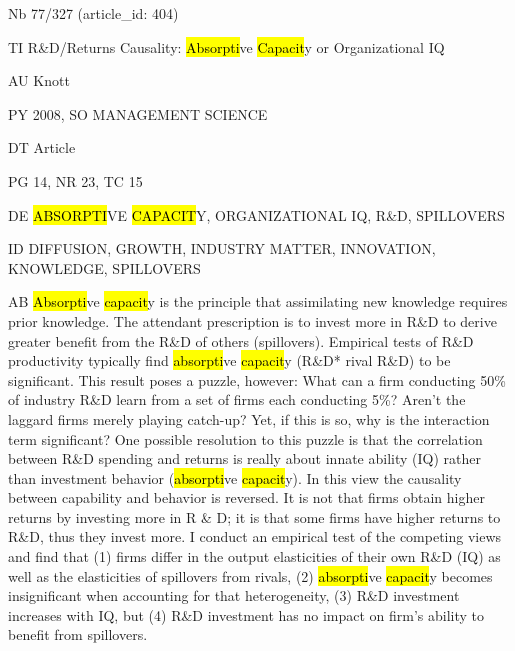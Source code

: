 \documentclass[a4paper]{article}
\begin{document}
\vspace*{-2cm}
Nb \tabto{0cm}77/327 (article\_id: 404)\par
TI \tabto{0cm}R\&D/Returns Causality: \hl{Absorpti}ve \hl{Capacit}y or Organizational IQ\par
AU \tabto{0cm}Knott\par
PY \tabto{0cm}2008, SO MANAGEMENT SCIENCE\par
DT \tabto{0cm}Article\par
PG \tabto{0cm}14, NR 23, TC 15\par
DE \tabto{0cm}\hl{ABSORPTI}VE \hl{CAPACIT}Y, ORGANIZATIONAL IQ, R\&D, SPILLOVERS\par
ID \tabto{0cm}DIFFUSION, GROWTH, INDUSTRY MATTER, INNOVATION, KNOWLEDGE, SPILLOVERS\par
AB \tabto{0cm}\hl{Absorpti}ve \hl{capacit}y is the principle that assimilating new knowledge requires prior knowledge. The attendant prescription is to invest more in R\&D to derive greater benefit from the R\&D of others (spillovers). Empirical tests of R\&D productivity typically find \hl{absorpti}ve \hl{capacit}y (R\&D* rival R\&D) to be significant. This result poses a puzzle, however: What can a firm conducting 50\% of industry R\&D learn from a set of firms each conducting 5\%? Aren't the laggard firms merely playing catch-up? Yet, if this is so, why is the interaction term significant?
One possible resolution to this puzzle is that the correlation between R\&D spending and returns is really about innate ability (IQ) rather than investment behavior (\hl{absorpti}ve \hl{capacit}y). In this view the causality between capability and behavior is reversed. It is not that firms obtain higher returns by investing more in R \& D; it is that some firms have higher returns to R\&D, thus they invest more. I conduct an empirical test of the competing views and find that (1) firms differ in the output elasticities of their own R\&D (IQ) as well as the elasticities of spillovers from rivals, (2) \hl{absorpti}ve \hl{capacit}y becomes insignificant when accounting for that heterogeneity, (3) R\&D investment increases with IQ, but (4) R\&D investment has no impact on firm's ability to benefit from spillovers.\par
\clearpage
\end{document}
